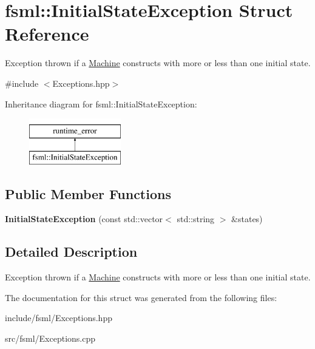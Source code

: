 \hypertarget{structfsml_1_1InitialStateException}{\section{fsml\-:\-:Initial\-State\-Exception Struct Reference}
\label{structfsml_1_1InitialStateException}
}


Exception thrown if a \hyperlink{classfsml_1_1Machine}{Machine} constructs with more or less than one initial state.  




{\ttfamily \#include $<$Exceptions.\-hpp$>$}

Inheritance diagram for fsml\-:\-:Initial\-State\-Exception\-:\begin{figure}[H]
\begin{center}
\leavevmode
\includegraphics[height=2.000000cm]{structfsml_1_1InitialStateException}
\end{center}
\end{figure}
\subsection*{Public Member Functions}
\begin{DoxyCompactItemize}
\item 
\hypertarget{structfsml_1_1InitialStateException_ae4cf2e419f5f5d221af4d7de2907dbb5}{{\bfseries Initial\-State\-Exception} (const std\-::vector$<$ std\-::string $>$ \&states)}\label{structfsml_1_1InitialStateException_ae4cf2e419f5f5d221af4d7de2907dbb5}

\end{DoxyCompactItemize}


\subsection{Detailed Description}
Exception thrown if a \hyperlink{classfsml_1_1Machine}{Machine} constructs with more or less than one initial state. 



The documentation for this struct was generated from the following files\-:\begin{DoxyCompactItemize}
\item 
include/fsml/Exceptions.\-hpp\item 
src/fsml/Exceptions.\-cpp\end{DoxyCompactItemize}
